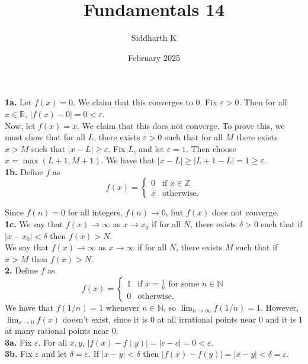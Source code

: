 \documentclass{article}
\title{Fundamentals 14}
\author{Siddharth K}
\date{February 2025}
\newcommand{\R}{\mathbb{R}}
\newcommand{\N}{\mathbb{N}}
\newcommand{\Z}{\mathbb{Z}}
\newcommand{\eps}{\varepsilon}
\begin{document}
\maketitle

\textbf{1a.} Let $f(x) = 0$. We claim that this converges to $0$. Fix $\eps > 0$. Then for all $x \in \R$, $|f(x) - 0| = 0 < \eps$. \\

Now, let $f(x) = x$. We claim that this does not converge. To prove this, we must show that for all $L$, there exists $\eps > 0$ such that for all $M$ there exists $x > M$ such that $|x - L| \ge \eps$. Fix $L$, and let $\eps = 1$. Then choose $x = \max(L + 1, M + 1)$. We have that $|x - L| \ge |L + 1 - L| = 1 \ge \eps$. \\

\textbf{1b.} Define $f$ as
$$f(x) = \begin{cases}
      0 & \text{if } x \in \Z \\
      x & \text{otherwise}.
   \end{cases}$$

Since $f(n) = 0$ for all integers, $f(n) \to 0$, but $f(x)$ does not converge. \\

\textbf{1c.} We say that $f(x) \to \infty$ as $x \to x_0$ if for all $N$, there exists $\delta > 0$ such that if $|x - x_0| < \delta$ then $f(x) > N$. \\

We say that $f(x) \to \infty$ as $x \to \infty$ if for all $N$, there exists $M$ such that if $x > M$ then $f(x) > N$. \\

\textbf{2.} Define $f$ as
$$f(x) = \begin{cases}
      1 & \text{if } x = \frac{1}{n} \text{ for some } n \in \N \\
      0 & \text{otherwise}.
   \end{cases}$$
We have that $f(1/n) = 1$ whenever $n \in \N$, so $\lim_{n \to \infty} f(1/n) = 1$. However, $\lim_{x \to 0} f(x)$ doesn't exist, since it is $0$ at all irrational points near $0$ and it is $1$ at many rational points near $0$. \\

\textbf{3a.} Fix $\eps$. For all $x, y$, $|f(x) - f(y)| = |c - c| = 0 < \eps$. \\

\textbf{3b.} Fix $\eps$ and let $\delta = \eps$. If $|x - y| < \delta$ then $|f(x) - f(y)| = |x - y| < \delta = \eps$. \\
\end{document}
